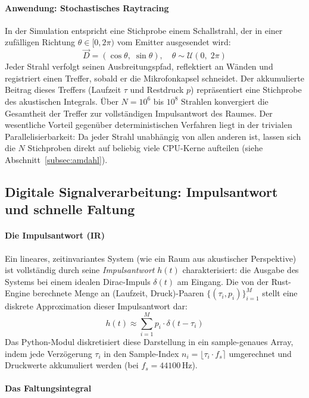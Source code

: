\paragraph{Anwendung: Stochastisches Raytracing}

In der Simulation entspricht eine Stichprobe einem Schallstrahl, der in einer zufälligen Richtung $\theta \in [0, 2\pi)$ vom Emitter ausgesendet wird:
\[\vec{D} = (\cos\theta,\; \sin\theta), \quad \theta \sim \mathcal{U}(0,\; 2\pi)\]
Jeder Strahl verfolgt seinen Ausbreitungspfad, reflektiert an Wänden und registriert einen Treffer, sobald er die Mikrofonkapsel schneidet.
Der akkumulierte Beitrag dieses Treffers (Laufzeit $\tau$ und Restdruck $p$) repräsentiert eine Stichprobe des akustischen Integrals.
Über $N = 10^6$ bis $10^8$ Strahlen konvergiert die Gesamtheit der Treffer zur vollständigen Impulsantwort des Raumes.
Der wesentliche Vorteil gegenüber deterministischen Verfahren liegt in der trivialen Parallelisierbarkeit: Da jeder Strahl unabhängig von allen anderen ist, lassen sich die $N$ Stichproben direkt auf beliebig viele CPU-Kerne aufteilen (siehe Abschnitt~\ref{subsec:amdahl}).


\subsection{Digitale Signalverarbeitung: Impulsantwort und schnelle Faltung}
\label{subsec:dsp}

\paragraph{Die Impulsantwort (IR)}

Ein lineares, zeitinvariantes System (wie ein Raum aus akustischer Perspektive) ist vollständig durch seine \emph{Impulsantwort} $h(t)$ charakterisiert: die Ausgabe des Systems bei einem idealen Dirac-Impuls $\delta(t)$ am Eingang.
Die von der Rust-Engine berechnete Menge an (Laufzeit, Druck)-Paaren $\{(\tau_i, p_i)\}_{i=1}^{M}$ stellt eine diskrete Approximation dieser Impulsantwort dar:
\[h(t) \approx \sum_{i=1}^{M} p_i \cdot \delta(t - \tau_i)\]
Das Python-Modul diskretisiert diese Darstellung in ein sample-genaues Array, indem jede Verzögerung $\tau_i$ in den Sample-Index $n_i = \lfloor \tau_i \cdot f_s \rceil$ umgerechnet und Druckwerte akkumuliert werden (bei $f_s = 44100\,\text{Hz}$).

\paragraph{Das Faltungsintegral}

